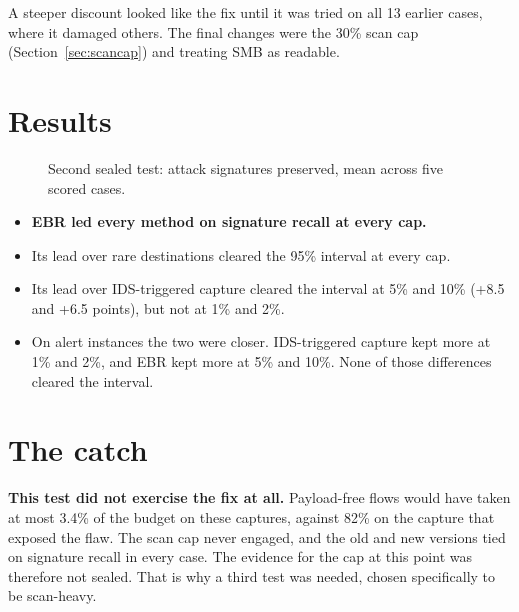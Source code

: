 A steeper discount looked like the fix until it was tried on all 13 earlier cases, where it damaged others. The final changes were the 30\% scan cap (Section~\ref{sec:scancap}) and treating SMB as readable.

\section{Results}
\begin{figure}[H]
\centering
{}
\caption{Second sealed test: attack signatures preserved, mean across five scored cases.}
\end{figure}

\begin{itemize}
\item \textbf{EBR led every method on signature recall at every cap.}
\item Its lead over rare destinations cleared the 95\% interval at every cap.
\item Its lead over IDS-triggered capture cleared the interval at 5\% and 10\% (+8.5 and +6.5 points), but not at 1\% and 2\%.
\item On alert instances the two were closer. IDS-triggered capture kept more at 1\% and 2\%, and EBR kept more at 5\% and 10\%. None of those differences cleared the interval.
\end{itemize}

\section{The catch}
\begin{honest}
\textbf{This test did not exercise the fix at all.} Payload-free flows would have taken at most 3.4\% of the budget on these captures, against 82\% on the capture that exposed the flaw. The scan cap never engaged, and the old and new versions tied on signature recall in every case. The evidence for the cap at this point was therefore not sealed. That is why a third test was needed, chosen specifically to be scan-heavy.
\end{honest}

